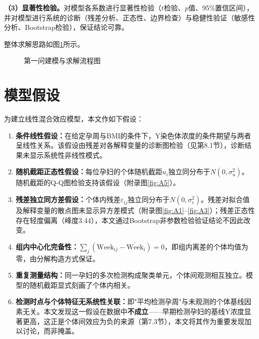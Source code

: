 \documentclass[12pt,a4paper]{ctexart}
\begin{document}
\textbf{（3）显著性检验。}对模型各系数进行显著性检验（$t$检验、$p$值、95\%置信区间），并对模型进行系统的诊断（残差分析、正态性、边界检查）与稳健性验证（敏感性分析、Bootstrap检验），保证结论可靠。

整体求解思路如图\ref{fig:flow}所示。

\begin{figure}[htbp]
\centering
{}
\caption{第一问建模与求解流程图}
\label{fig:flow}
\end{figure}

\section{模型假设}

为建立线性混合效应模型，本文作如下假设：

\begin{enumerate}[label=(\arabic*),leftmargin=2.5em]
\item \textbf{条件线性假设：}在给定孕周与BMI的条件下，Y染色体浓度的条件期望与两者呈线性关系。该假设由残差对各解释变量的诊断图检验（见第8.1节），诊断结果未显示系统性非线性模式。
\item \textbf{随机截距正态性假设：}每位孕妇的个体随机截距$u_i$独立同分布于$N(0,\sigma_u^2)$。随机截距的Q-Q图检验支持该假设（附录图\ref{fig:A5}）。
\item \textbf{残差独立同方差假设：}个体内残差$\varepsilon_{ij}$独立同分布于$N(0,\sigma_e^2)$。残差对拟合值及解释变量的散点图未显示异方差模式（附录图\ref{fig:A1}--\ref{fig:A3}）；残差正态性存在轻度偏离（峰度3.44），本文通过Bootstrap非参数检验验证结论不因此改变。
\item \textbf{组内中心化完备性：}$\sum_j(\mathrm{Week}_{ij}-\overline{\mathrm{Week}}_i)=0$，即组内离差的个体均值为零，由分解构造方式保证。
\item \textbf{重复测量结构：}同一孕妇的多次检测构成聚类单元，个体间观测相互独立。模型的随机截距显式刻画了个体内相关。
\item \textbf{检测时点与个体特征无系统性关联：}即"平均检测孕周"与未观测的个体基线因素无关。本文发现这一假设在数据中\textbf{不成立}——早期检测孕妇的基线Y浓度显著更高，这正是个体间效应为负的来源（第7.3节），本文将其作为重要发现加以讨论，而非掩盖。
\end{enumerate}
\end{document}
